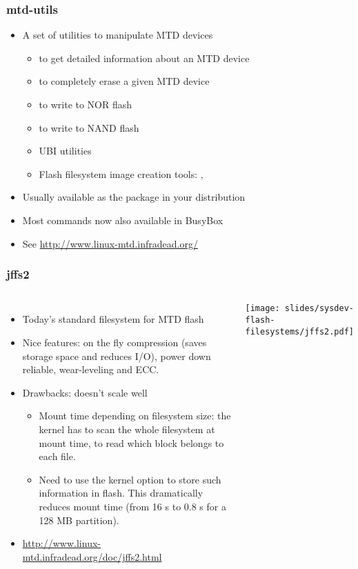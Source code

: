 \begin{frame}
  \frametitle{mtd-utils}
  \begin{itemize}
  \item A set of utilities to manipulate MTD devices
    \begin{itemize}
    \item {} to get detailed information about an MTD device
    \item {} to completely erase a given MTD device
    \item {} to write to NOR flash
    \item {} to write to NAND flash
    \item UBI utilities
    \item Flash filesystem image creation tools: ,
    \end{itemize}
  \item Usually available as the  package in your distribution
  \item Most commands now also available in BusyBox
  \item See \url{http://www.linux-mtd.infradead.org/}
  \end{itemize}
\end{frame}

\begin{frame}
  \frametitle{jffs2}
  \begin{columns}
    \begin{itemize}
    \item Today's standard filesystem for MTD flash
    \item Nice features: on the fly compression (saves storage space
      and reduces I/O), power down reliable, wear-leveling and ECC.
    \item Drawbacks: doesn't scale well
      \begin{itemize}
      \item Mount time depending on filesystem size: the kernel has to
        scan the whole filesystem at mount time, to read which block
        belongs to each file.
      \item Need to use the  kernel option
        to store such information in flash. This dramatically reduces
        mount time (from 16 s to 0.8 s for a 128 MB partition).
      \end{itemize}
    \item \url{http://www.linux-mtd.infradead.org/doc/jffs2.html}
    \end{itemize}
    \texttt{[image: slides/sysdev-flash-filesystems/jffs2.pdf]}
  \end{columns}
\end{frame}

